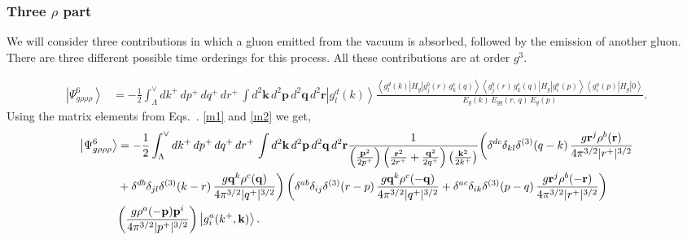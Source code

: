\documentclass[aps,prd,amsmath,amssymb,nofootinbib]{revtex4-2}
\numberwithin{equation}{section}
\begin{document}
\subsubsection{Three $\rho$ part}
We will consider three contributions in which a gluon emitted from the vacuum is absorbed, followed by the emission of another gluon. There are three different possible time orderings for this process. All these contributions are at order $g^{3}$. 
\begin{figure}[h]
    \label{fig:1}
\end{figure}
\begin{figure}[h]
    \label{fig:2} 
\end{figure}
\begin{align}\label{3rho}
 \left|\Psi_{g\rho\rho\rho}^{6}\right\rangle  & = -\frac{1}{2}\int_{\Lambda}^{\vee}dk^{+}\, dp^{+}\, dq^{+}\, dr^{+}\,\int d^{2}\mathbf{k}\, d^{2}\mathbf{p}\, d^{2}\mathbf{q}\, d^{2}\mathbf{r}\left|g_{l}^{d}(k)\right\rangle \frac{\left\langle g_{l}^{d}(k)\left|H_{g}\right|g_{j}^{b}(r)\, g_{k}^{c}(q)\right\rangle \left\langle g_{j}^{b}(r)\, g_{k}^{c}(q)\left|H_{g}\right|g_{i}^{a}(p)\right\rangle \left\langle g_{i}^{a}(p)\left|H_{g}\right|0\right\rangle }{E_{g}(k)\, E_{gg}(r,\, q)\, E_{g}(p)}.
\end{align}
Using the matrix elements from Eqs.~. \eqref{m1} and \eqref{m2} we get,
\begin{align}\label{stseve}
\left|\Psi_{g\rho\rho\rho}^{6}\right\rangle & =-\frac{1}{2}\int_{\Lambda}^{\vee}dk^{+}\, dp^{+}\, dq^{+}\, dr^{+}\,\int d^{2}\mathbf{k}\, d^{2}\mathbf{p}\, d^{2}\mathbf{q}\, d^{2}\mathbf{r}\frac{1}{\left(\frac{\mathbf{p}^{2}}{2p^{+}}\right)\left(\frac{\mathbf{r}^{2}}{2r^{+}}+\frac{\mathbf{q}^{2}}{2q^{+}}\right)\left(\frac{\mathbf{k}^{2}}{2k^{+}}\right)}\bigg(\delta^{dc}\delta_{kl}\delta^{(3)}(q-k)\,\frac{g\mathbf{r}^{j}\rho^{b}(\mathbf{r})}{4\pi^{3/2}|r^{+}|^{3/2}}\notag \\ & +\delta^{db}\delta_{jl}\delta^{(3)}(k-r)\,\frac{g\mathbf{q}^{k}\rho^{c}(\mathbf{q})}{4\pi^{3/2}|q^{+}|^{3/2}}\bigg)\left(\delta^{ab}\delta_{ij}\delta^{(3)}(r-p)\,\frac{g\mathbf{q}^{k}\rho^{c}(-\mathbf{q})}{4\pi^{3/2}|q^{+}|^{3/2}}+\delta^{ac}\delta_{ik}\delta^{(3)}(p-q)\,\frac{g\mathbf{r}^{j}\rho^{b}(-\mathbf{r})}{4\pi^{3/2}|r^{+}|^{3/2}}\right)\notag \\ & \bigg(\frac{g\rho^{a}(-\mathbf{p})\mathbf{p}^{i}}{4\pi^{3/2}|p^{+}|^{3/2}}\bigg)\left|g_{i}^{a}(k^{+},\mathbf{k})\right\rangle.
\end{align}
\end{document}
